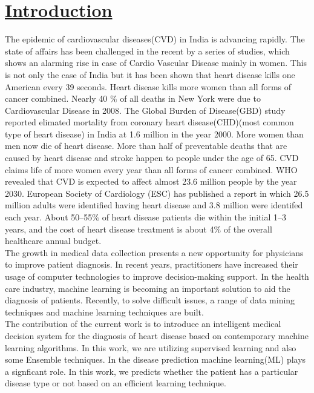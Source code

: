 \documentclass[11pt]{article}
\begin{document}
\section{\underline{Introduction}}
The epidemic of cardiovascular diseases(CVD) \cite{abc7} in India is advancing rapidly. The state of affairs has been challenged in the recent  by a series of studies, which shows an alarming rise in case of Cardio Vascular Disease mainly in women. This is not only the case of India but it has been shown that heart disease kills one American every 39 seconds. Heart disease kills more women than all forms of cancer combined. Nearly 40 $\%$ of all deaths in New York were due to Cardiovascular Disease in 2008. The Global Burden of Disease(GBD)\cite{abc8} study reported elimated mortality from coronary heart disease(CHD)(most common type of heart disease) in India at 1.6 million in the year 2000. More women than men now die of heart disease. More than half of preventable deaths that are caused by heart disease and stroke happen to people under the age of 65. CVD claims life of more women every year than all forms of cancer combined. WHO revealed that CVD is expected to affect almost 23.6 million people by the year 2030. European Society of Cardiology (ESC) has published a report in which 26.5 million adults were identified having heart disease and 3.8 million were identifed each year. About 50–55$\%$ of heart disease patients die within the initial 1–3 years, and the cost of heart disease treatment is about 4$\%$ of the overall healthcare annual budget.\cite{abc3}\\
The growth in medical data collection presents a new opportunity for physicians to improve patient diagnosis. In recent years, practitioners have increased their usage of computer technologies to improve 
decision-making support. In the health care industry, machine learning is becoming an important solution to aid the diagnosis of patients. Recently, to
solve difficult issues, a range of data mining techniques and machine learning techniques are built.\\
The contribution of the current work is to introduce an intelligent medical decision system for the diagnosis of heart disease based on contemporary machine learning algorithms.
In this work, we are utilizing supervised learning and also some Ensemble techniques. In the disease prediction machine learning(ML) plays a signficant role. In this work, we predicts whether the patient has a particular disease type or not based on an efficient learning technique.\\
\end{document}
